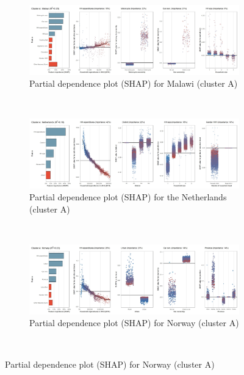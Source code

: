 \begin{figure}[ht!]\ContinuedFloat
    \centering
   \begin{subfigure}[b]{\textwidth}
   \centering
         \caption{Partial dependence plot (SHAP) for Malawi (cluster A)}
         \label{fig:5b_MWI}
         \includegraphics[width=\textwidth]{Figure 5b/Figure_5b_MWI}
         \end{subfigure}
    \\
    \vspace{0.5cm}
    \begin{subfigure}[b]{\textwidth}
    \centering
         \caption{Partial dependence plot (SHAP) for the Netherlands (cluster A)}
         \label{fig:5b_NLD}
         \includegraphics[width=\textwidth]{Figure 5b/Figure_5b_NLD}
         \end{subfigure}
    \\
    \vspace{0.5cm}
   \begin{subfigure}[b]{\textwidth}
   \centering
         \caption{Partial dependence plot (SHAP) for Norway (cluster A)}
         \label{fig:5b_NOR}
         \includegraphics[width=\textwidth]{Figure 5b/Figure_5b_NOR} 
         \end{subfigure}
    \\
    \vspace{0.5cm}
   

\end{figure}
